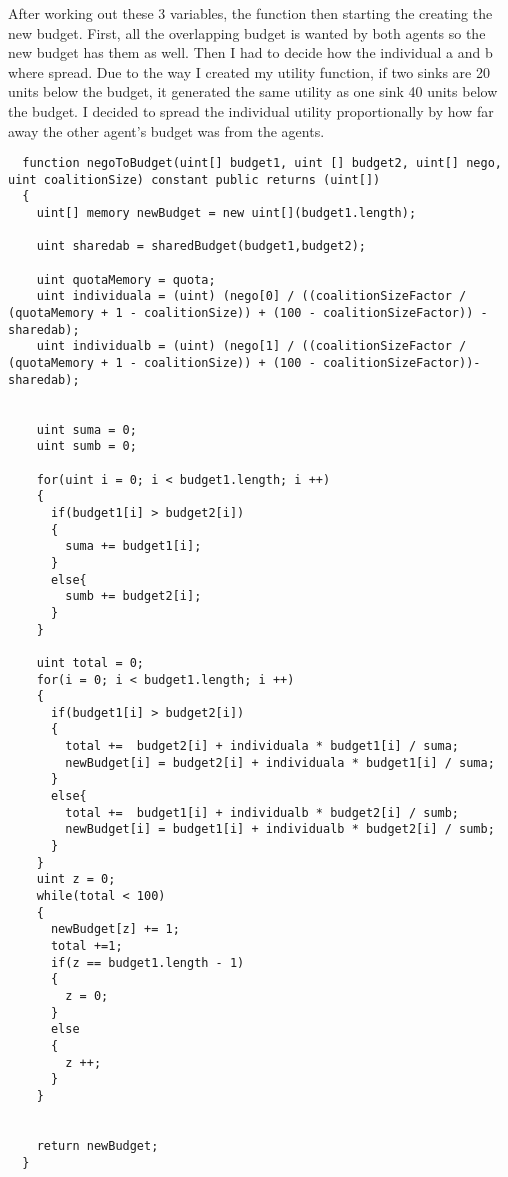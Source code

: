 After working out these 3 variables, the function then starting the creating the new budget. First, all the overlapping budget is wanted by both agents so the new budget has them as well. Then I had to decide how the individual a and b where spread. Due to the way I created my utility function, if two sinks are 20 units below the budget, it generated the same utility as one sink 40 units below the budget. I decided to spread the individual utility proportionally by how far away the other agent’s budget was from the agents. 
\begin{lstlisting} 
  function negoToBudget(uint[] budget1, uint [] budget2, uint[] nego, uint coalitionSize) constant public returns (uint[])
  {
    uint[] memory newBudget = new uint[](budget1.length);

    uint sharedab = sharedBudget(budget1,budget2);

    uint quotaMemory = quota;
    uint individuala = (uint) (nego[0] / ((coalitionSizeFactor / (quotaMemory + 1 - coalitionSize)) + (100 - coalitionSizeFactor)) - sharedab);
    uint individualb = (uint) (nego[1] / ((coalitionSizeFactor / (quotaMemory + 1 - coalitionSize)) + (100 - coalitionSizeFactor))- sharedab);


    uint suma = 0;
    uint sumb = 0;

    for(uint i = 0; i < budget1.length; i ++)
    {
      if(budget1[i] > budget2[i])
      {
        suma += budget1[i];
      }
      else{
        sumb += budget2[i];
      }
    }

    uint total = 0;
    for(i = 0; i < budget1.length; i ++)
    {
      if(budget1[i] > budget2[i])
      {
        total +=  budget2[i] + individuala * budget1[i] / suma;
        newBudget[i] = budget2[i] + individuala * budget1[i] / suma;
      }
      else{
        total +=  budget1[i] + individualb * budget2[i] / sumb;
        newBudget[i] = budget1[i] + individualb * budget2[i] / sumb;
      }
    }
    uint z = 0;
    while(total < 100)
    {
      newBudget[z] += 1;
      total +=1;
      if(z == budget1.length - 1)
      {
        z = 0;
      }
      else
      {
        z ++;
      }
    }


    return newBudget;
  }
\end{lstlisting}
